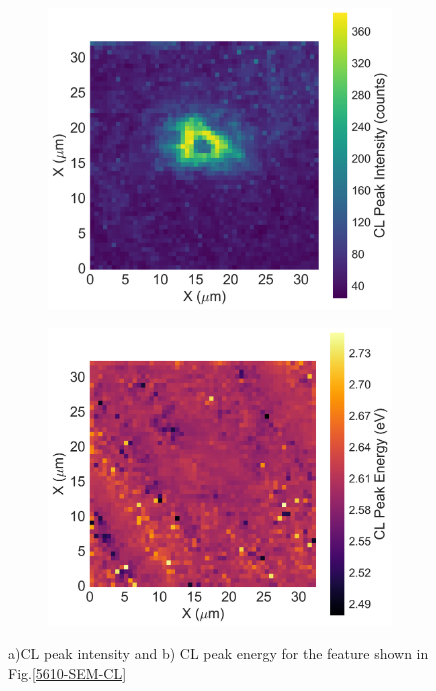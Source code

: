 \begin{figure}[h]
	
	\begin{subfigure}[b]{0.48\textwidth}
		\centering
		\includegraphics[width=1\linewidth]{Figs/Ch3/A-peak}
		\caption{}
		
	\end{subfigure}%
	\hspace*{0.5cm}
	\begin{subfigure}[b]{0.48\textwidth}
		\centering
		\includegraphics[width=1\linewidth]{Figs/Ch3/A-centre}
		\caption{}
	\end{subfigure}%
	
	\caption{a)CL peak intensity and b) CL peak energy for the feature shown in Fig.\ref{5610-SEM-CL}}
	\label{A-CL}
\end{figure}
\FloatBarrier


